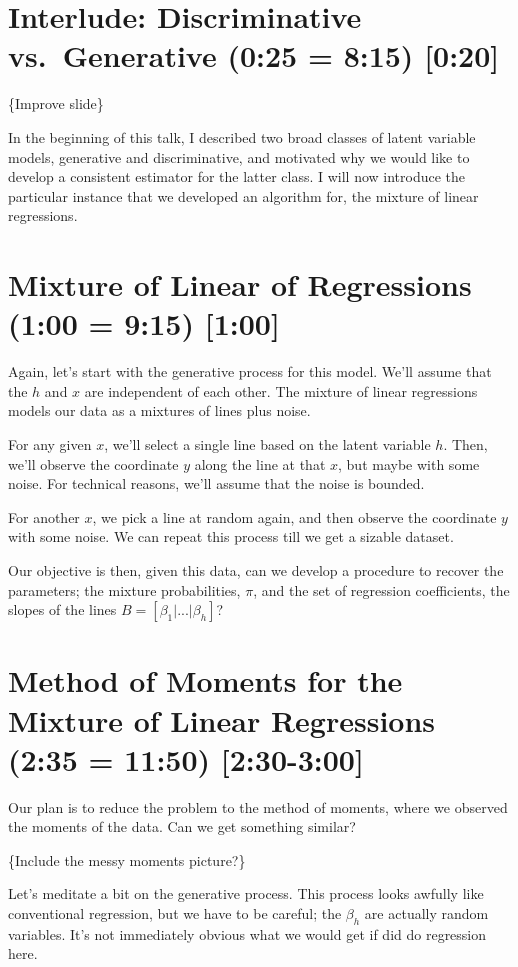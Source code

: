 \documentclass[tablecaption=bottom]{jmlr}
\begin{document}
\section{Interlude: Discriminative vs.~Generative (0:25 = 8:15)
{[}0:20{]}}

\{Improve slide\}

In the beginning of this talk, I described two broad classes of latent
variable models, generative and discriminative, and motivated why we
would like to develop a consistent estimator for the latter class. I
will now introduce the particular instance that we developed an
algorithm for, the mixture of linear regressions.

\section{Mixture of Linear of Regressions (1:00 = 9:15) {[}1:00{]}}

Again, let's start with the generative process for this model. We'll
assume that the $h$ and $x$ are independent of each other. The mixture
of linear regressions models our data as a mixtures of lines plus noise.

For any given $x$, we'll select a single line based on the latent
variable $h$. Then, we'll observe the coordinate $y$ along the line at
that $x$, but maybe with some noise. For technical reasons, we'll assume
that the noise is bounded.

For another $x$, we pick a line at random again, and then observe the
coordinate $y$ with some noise. We can repeat this process till we get a
sizable dataset.

Our objective is then, given this data, can we develop a procedure to
recover the parameters; the mixture probabilities, $\pi$, and the set of
regression coefficients, the slopes of the lines
$B = [\beta_1| ... | \beta_h]$?

\section{Method of Moments for the Mixture of Linear Regressions (2:35 =
11:50) {[}2:30-3:00{]}}

Our plan is to reduce the problem to the method of moments, where we
observed the moments of the data. Can we get something similar?

\{Include the messy moments picture?\}

Let's meditate a bit on the generative process. This process looks
awfully like conventional regression, but we have to be careful; the
$\beta_h$ are actually random variables. It's not immediately obvious
what we would get if did do regression here.
\end{document}
